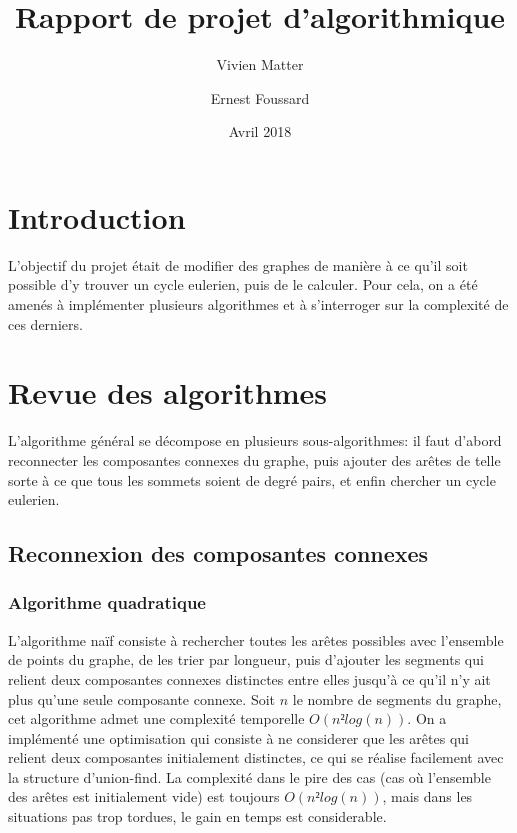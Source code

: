 \documentclass[a4paper,11pt]{article}
\title{Rapport de projet d'algorithmique}
\author{Vivien Matter \and Ernest Foussard}
\date{Avril 2018}
\begin{document}
\maketitle

\tableofcontents

\newpage

\section{Introduction}

L'objectif du projet était de modifier des graphes de manière à ce qu'il soit
possible d'y trouver un cycle eulerien, puis de le calculer. Pour cela, on a été amenés
à implémenter plusieurs algorithmes et à s'interroger sur la complexité de ces derniers.

\section{Revue des algorithmes}

L'algorithme général se décompose en plusieurs sous-algorithmes: il faut d'abord reconnecter
les composantes connexes du graphe, puis ajouter des arêtes de telle sorte à ce que tous les
sommets soient de degré pairs, et enfin chercher un cycle eulerien.

\subsection{Reconnexion des composantes connexes}

\subsubsection{Algorithme quadratique}

L'algorithme naïf consiste à rechercher toutes les arêtes possibles avec l'ensemble de points
du graphe, de les trier par longueur, puis d'ajouter les segments qui relient deux composantes
connexes distinctes entre elles jusqu'à ce qu'il n'y ait plus qu'une seule composante connexe.
Soit $n$ le nombre de segments du graphe, cet algorithme admet une complexité temporelle $O(n²log(n))$.
On a implémenté une optimisation qui consiste à ne considerer que les arêtes qui relient deux composantes
initialement distinctes, ce qui se réalise facilement avec la structure d'union-find. La complexité dans
le pire des cas (cas où l'ensemble des arêtes est initialement vide) est toujours $O(n²log(n))$, mais
dans les situations pas trop tordues, le gain en temps est considerable.
\end{document}
